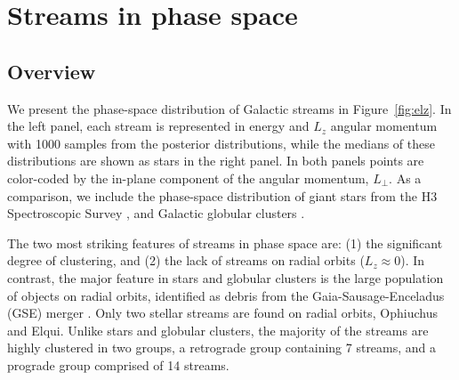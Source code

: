 \documentclass[twocolumn]{aastex63}
\begin{document}
\section{Streams in phase space}
\label{sec:phasespace}

\subsection{Overview}
\label{sec:elz}

We present the phase-space distribution of Galactic streams in Figure~\ref{fig:elz}.
In the left panel, each stream is represented in energy and $L_z$ angular momentum with 1000 samples from the posterior distributions, while the medians of these distributions are shown as stars in the right panel.
In both panels points are color-coded by the in-plane component of the angular momentum, $L_\perp$.
As a comparison, we include the phase-space distribution of giant stars from the H3 Spectroscopic Survey \citep[left panel, small black points;][]{conroy2019}, and Galactic globular clusters \citep[righ panel, small circles colored by $L_\perp$;][]{baumgardt2019}.


The two most striking features of streams in phase space are: (1) the significant degree of clustering, and (2) the lack of streams on radial orbits ($L_z\approx0$).
In contrast, the major feature in stars and globular clusters is the large population of objects on radial orbits, identified as debris from the Gaia-Sausage-Enceladus (GSE) merger \citep[e.g.,][]{belokurov2018, helmi2018, naidu2020}.
Only two stellar streams are found on radial orbits, Ophiuchus and Elqui.
Unlike stars and globular clusters, the majority of the streams are highly clustered in two groups, a retrograde group containing 7 streams, and a prograde group comprised of 14 streams.
\end{document}
